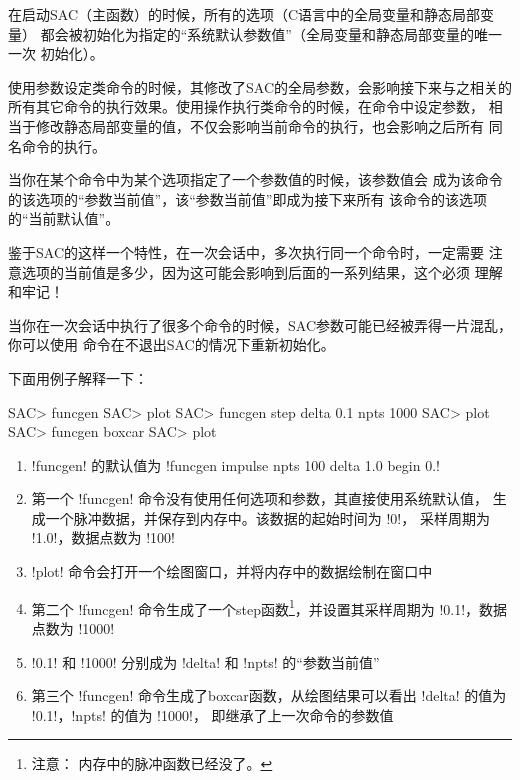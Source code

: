 在启动SAC（主函数）的时候，所有的选项（C语言中的全局变量和静态局部变量）
都会被初始化为指定的``系统默认参数值''（全局变量和静态局部变量的唯一一次
初始化）。

使用参数设定类命令的时候，其修改了SAC的全局参数，会影响接下来与之相关的
所有其它命令的执行效果。使用操作执行类命令的时候，在命令中设定参数，
相当于修改静态局部变量的值，不仅会影响当前命令的执行，也会影响之后所有
同名命令的执行。

当你在某个命令中为某个选项指定了一个参数值的时候，该参数值会
成为该命令的该选项的``参数当前值''，该``参数当前值''即成为接下来所有
该命令的该选项的``当前默认值''。

鉴于SAC的这样一个特性，在一次会话中，多次执行同一个命令时，一定需要
注意选项的当前值是多少，因为这可能会影响到后面的一系列结果，这个必须
理解和牢记！

\begin{note}
当你在一次会话中执行了很多个命令的时候，SAC参数可能已经被弄得一片混乱，
你可以使用  命令在不退出SAC的情况下重新初始化。
\end{note}

下面用例子解释一下：
\begin{SACCode}
SAC> funcgen
SAC> plot
SAC> funcgen step delta 0.1 npts 1000
SAC> plot
SAC> funcgen boxcar
SAC> plot
\end{SACCode}

\begin{enumerate}
\item !funcgen! 的默认值为 !funcgen impulse npts 100 delta 1.0 begin 0.!
\item 第一个 !funcgen! 命令没有使用任何选项和参数，其直接使用系统默认值，
    生成一个脉冲数据，并保存到内存中。该数据的起始时间为 !0!，
    采样周期为 !1.0!，数据点数为 !100!
\item !plot! 命令会打开一个绘图窗口，并将内存中的数据绘制在窗口中
\item 第二个 !funcgen! 命令生成了一个step函数\footnote{注意：
    内存中的脉冲函数已经没了。}，并设置其采样周期为 !0.1!，数据
    点数为 !1000!
\item !0.1! 和 !1000! 分别成为 !delta! 和
    !npts! 的``参数当前值''
\item 第三个 !funcgen! 命令生成了boxcar函数，从绘图结果可以看出
    !delta! 的值为 !0.1!，!npts! 的值为 !1000!，
    即继承了上一次命令的参数值
\end{enumerate}
